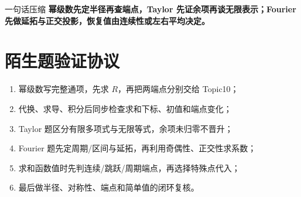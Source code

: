 \documentclass[11pt,a4paper,fontset=fandol]{ctexart}
\begin{document}
\begin{corebox}{一句话压缩}
\textbf{幂级数先定半径再查端点，Taylor 先证余项再谈无限表示；Fourier 先做延拓与正交投影，恢复值由连续性或左右平均决定。}
\end{corebox}

\section{陌生题验证协议}
\begin{enumerate}
  \item 幂级数写完整通项，先求 $R$，再把两端点分别交给 Topic10；
  \item 代换、求导、积分后同步检查求和下标、初值和端点变化；
  \item Taylor 题区分有限多项式与无限等式，余项未归零不晋升；
  \item Fourier 题先定周期/区间与延拓，再利用奇偶性、正交性求系数；
  \item 求和函数值时先判连续/跳跃/周期端点，再选择特殊点代入；
  \item 最后做半径、对称性、端点和简单值的闭环复核。
\end{enumerate}
\end{document}
